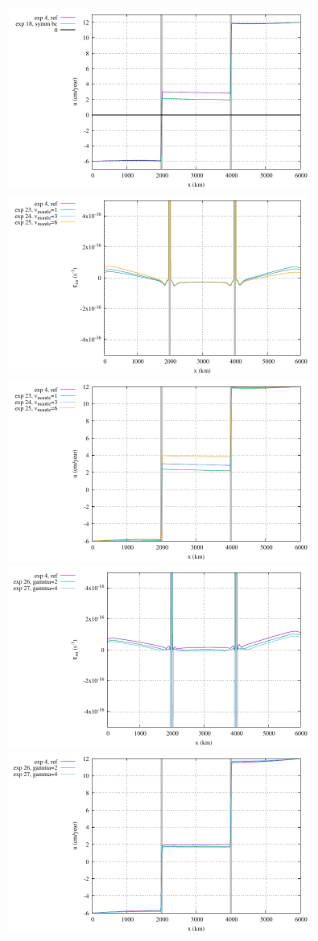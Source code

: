 \begin{center}
\includegraphics[width=8cm]{python_codes/fieldstone_148/results/fig5_u_surface}\\
\includegraphics[width=8cm]{python_codes/fieldstone_148/results/fig6_exx_surface}
\includegraphics[width=8cm]{python_codes/fieldstone_148/results/fig6_u_surface}\\
\includegraphics[width=8cm]{python_codes/fieldstone_148/results/fig7_exx_surface}
\includegraphics[width=8cm]{python_codes/fieldstone_148/results/fig7_u_surface}\\
\end{center}

